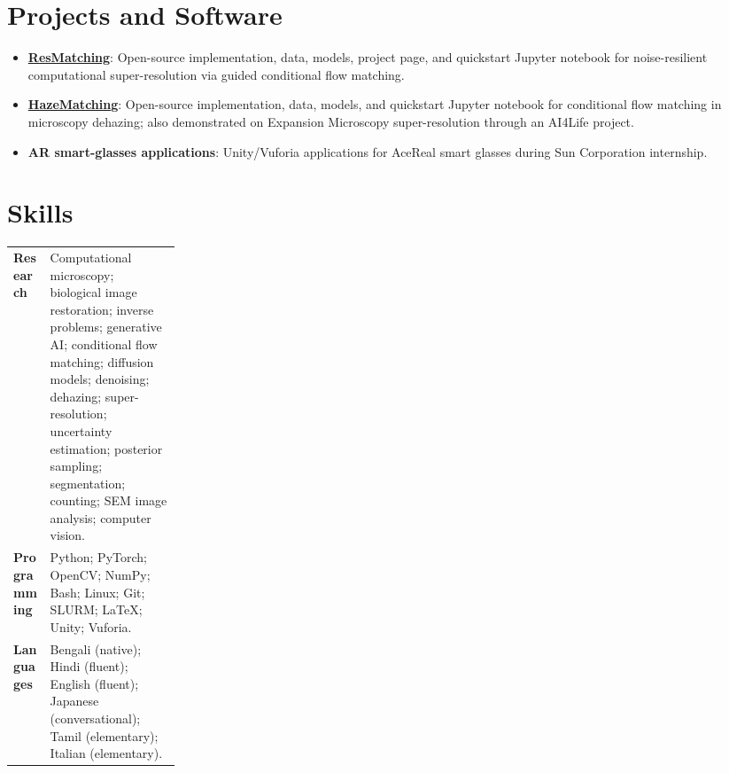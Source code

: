 \documentclass[11pt,a4paper]{article}
\begin{document}
\section*{Projects and Software}
\begin{itemize}
  \item \textbf{\href{https://github.com/juglab/resmatching}{ResMatching}}: Open-source implementation, data, models, project page, and quickstart Jupyter notebook for noise-resilient computational super-resolution via guided conditional flow matching.
  \item \textbf{\href{https://github.com/juglab/HazeMatching}{HazeMatching}}: Open-source implementation, data, models, and quickstart Jupyter notebook for conditional flow matching in microscopy dehazing; also demonstrated on Expansion Microscopy super-resolution through an AI4Life project.
  \item \textbf{AR smart-glasses applications}: Unity/Vuforia applications for AceReal smart glasses during Sun Corporation internship.
\end{itemize}

\section*{Skills}
\begin{tabularx}{\linewidth}{@{}>{\bfseries}p{0.22\linewidth} X@{}}
Research & Computational microscopy; biological image restoration; inverse problems; generative AI; conditional flow matching; diffusion models; denoising; dehazing; super-resolution; uncertainty estimation; posterior sampling; segmentation; counting; SEM image analysis; computer vision.\\
Programming & Python; PyTorch; OpenCV; NumPy; Bash; Linux; Git; SLURM; \LaTeX; Unity; Vuforia.\\
Languages & Bengali (native); Hindi (fluent); English (fluent); Japanese (conversational); Tamil (elementary); Italian (elementary).\\
\end{tabularx}
\end{document}
